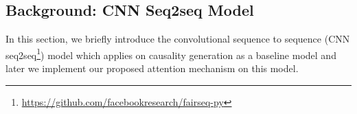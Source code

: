 \subsection{Background: CNN Seq2seq Model}
\label{sec:cnn}
In this section, we briefly introduce the convolutional sequence to sequence (CNN seq2seq\footnote{\url{https://github.com/facebookresearch/fairseq-py}}) model which applies on causality generation as a baseline model and later we implement our proposed attention mechanism on this model.

%

